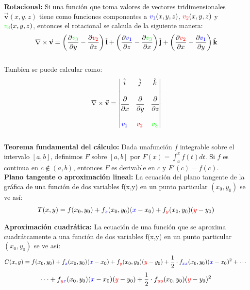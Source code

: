\documentclass[12pt,a4paper]{article}
\begin{document}
 \textbf{Rotacional:} Si una función que toma valores de vectores tridimensionales  $\vec{\textbf{v}}(x,y,z)$ tiene como funciones componentes a $\textcolor{blue}{v_1}(x,y,z)$, $\textcolor{red}{v_2}(x,y,z)$ y $\textcolor{green}{v_3}(x,y,z)$, entonces el rotacional se calcula de la siguiente manera:
$$\nabla \times \vec{\textbf{v}}  = \left( \dfrac{\partial \textcolor{green}{v_3}}{\partial y}- \dfrac{\partial \textcolor{red}{v_2}}{\partial z} \right)\hat{\textbf{i}} + \left( \dfrac{\partial \textcolor{blue}{v_1}}{\partial z}-  \dfrac{\partial \textcolor{green}{v_3}}{\partial x} \right)\hat{\textbf{j}} + \left( \dfrac{\partial \textcolor{red}{v_2}}{\partial x}- \dfrac{\partial \textcolor{blue}{v_1}}{\partial y} \right)\hat{\textbf{k}} $$
\\
Tambien se puede calcular como:
$$\nabla\times \vec{\textbf{v}}=\left|
\begin{matrix} \hat i & \hat j & \hat k  \\ & & \\
\cfrac{\partial}{\partial x} & \cfrac{\partial}{\partial y} & \cfrac{\partial}{\partial z}
\\ & & \\ \textcolor{blue}{v_1} & \textcolor{red}{v_2} & \textcolor{green}{v_3}  \end{matrix}\right|$$
\\


\textbf{Teorema fundamental del cálculo:} Dada unafunción $f$ integrable sobre el intervalo $ [a,b]$, definimos $F$ sobre $[a,b]$ por $F(x) = {\int_{a}^x f(t)dt}$. Si $f$ es continua en $c \notin (a,b)$, entonces $F$ es derivable en $c$ y $F'(c) = f(c)$.\\

\textbf{Plano tangente o aproximación lineal:} La ecuación del plano tangente de la gráfica de una función de dos variables f(x,y) en un punto particular $(x_0, y_0)$ se ve así:
$$T(x, y) = f(x_0, y_0) + {f_{\textcolor{blue}{x}}(x_0, y_0)}(\textcolor{blue}{x}-x_0) + {f_{\textcolor{red}{y}}(x_0, y_0)}(\textcolor{red}{y}-y_0) $$

\textbf{Aproximación cuadrática:} La ecuación de una función que se aproxima cuadrátcamente a una función de dos variables f(x,y) en un punto particular $(x_0, y_0)$ se ve así:
$$ C(x, y) = f(x_0, y_0) + {f_{\textcolor{blue}{x}}(x_0, y_0)}(\textcolor{blue}{x}-x_0) + {f_{\textcolor{red}{y}}(x_0, y_0)}(\textcolor{red}{y}-y_0)+\frac{1}{2} \cdot f_{\textcolor{blue}{xx}}(x_0, y_0)(\textcolor{blue}{x}-x_0)^2+ \cdots $$
  $$\cdots + f_{\textcolor{red}{y}\textcolor{blue}{x}}(x_0, y_0)(\textcolor{blue}{x}-x_0)(\textcolor{red}{y}-y_0)+ \frac{1}{2} \cdot {f_{\textcolor{red}{yy}}(x_0, y_0)}(\textcolor{red}{y}-y_0)^2 $$
\end{document}
